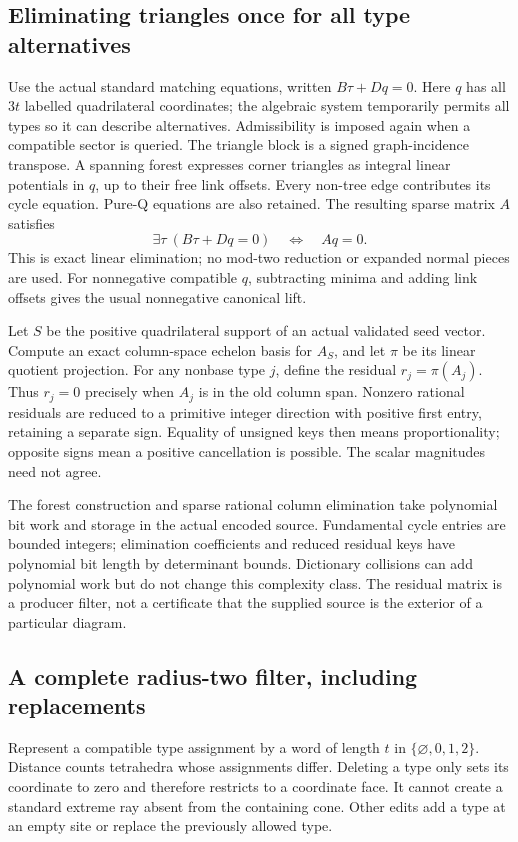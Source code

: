 \subsection{Eliminating triangles once for all type alternatives}

Use the actual standard matching equations, written
$B\tau+Dq=0$. Here $q$ has all $3t$ labelled quadrilateral coordinates;
the algebraic system temporarily permits all types so it can describe
alternatives. Admissibility is imposed again when a compatible sector is
queried. The triangle block is a signed graph-incidence transpose.
A spanning forest expresses corner triangles as integral linear potentials
in $q$, up to their free link offsets. Every non-tree edge contributes its
cycle equation. Pure-Q equations are also retained. The resulting sparse
matrix $A$ satisfies
\[
 \exists\tau\ (B\tau+Dq=0)\quad\Longleftrightarrow\quad Aq=0.
\]
This is exact linear elimination; no mod-two reduction or expanded normal
pieces are used. For nonnegative compatible $q$, subtracting minima and
adding link offsets gives the usual nonnegative canonical lift.

Let $S$ be the positive quadrilateral support of an actual validated seed
vector. Compute an exact column-space echelon basis for $A_S$, and let
$\pi$ be its linear quotient projection. For any nonbase type $j$, define
the residual $r_j=\pi(A_j)$. Thus $r_j=0$ precisely when $A_j$ is in the
old column span. Nonzero rational residuals are reduced to a primitive
integer direction with positive first entry, retaining a separate sign.
Equality of unsigned keys then means proportionality; opposite signs mean
a positive cancellation is possible. The scalar magnitudes need not agree.

The forest construction and sparse rational column elimination take
polynomial bit work and storage in the actual encoded source. Fundamental
cycle entries are bounded integers; elimination coefficients and reduced
residual keys have polynomial bit length by determinant bounds. Dictionary
collisions can add polynomial work but do not change this complexity class.
The residual matrix is a producer filter, not a certificate that the supplied
source is the exterior of a particular diagram.

\subsection{A complete radius-two filter, including replacements}

Represent a compatible type assignment by a word of length $t$ in
$\{\varnothing,0,1,2\}$. Distance counts tetrahedra whose assignments differ.
Deleting a type only sets its coordinate to zero and therefore restricts
to a coordinate face. It cannot create a standard extreme ray absent from
the containing cone. Other edits add a type at an empty site or replace
the previously allowed type.

